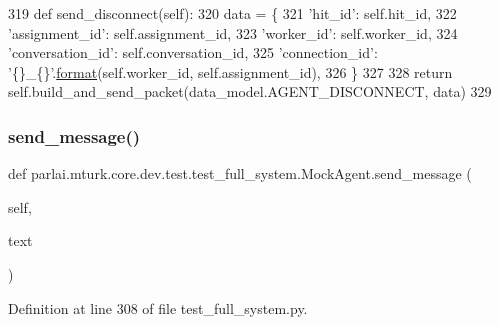 \begin{DoxyCode}
319     \textcolor{keyword}{def }send\_disconnect(self):
320         data = \{
321             \textcolor{stringliteral}{'hit\_id'}: self.hit\_id,
322             \textcolor{stringliteral}{'assignment\_id'}: self.assignment\_id,
323             \textcolor{stringliteral}{'worker\_id'}: self.worker\_id,
324             \textcolor{stringliteral}{'conversation\_id'}: self.conversation\_id,
325             \textcolor{stringliteral}{'connection\_id'}: \textcolor{stringliteral}{'\{\}\_\{\}'}.\hyperlink{namespaceparlai_1_1chat__service_1_1services_1_1messenger_1_1shared__utils_a32e2e2022b824fbaf80c747160b52a76}{format}(self.worker\_id, self.assignment\_id),
326         \}
327 
328         \textcolor{keywordflow}{return} self.build\_and\_send\_packet(data\_model.AGENT\_DISCONNECT, data)
329 
\end{DoxyCode}
\mbox{\label{classparlai_1_1mturk_1_1core_1_1dev_1_1test_1_1test__full__system_1_1MockAgent_ad083e4d20ea195735ab6694723a65ebd}} 
\subsubsection{\texorpdfstring{send\+\_\+message()}{send\_message()}}
{\footnotesize\ttfamily def parlai.\+mturk.\+core.\+dev.\+test.\+test\+\_\+full\+\_\+system.\+Mock\+Agent.\+send\+\_\+message (\begin{DoxyParamCaption}\item[{}]{self,  }\item[{}]{text }\end{DoxyParamCaption})}



Definition at line 308 of file test\+\_\+full\+\_\+system.\+py.


